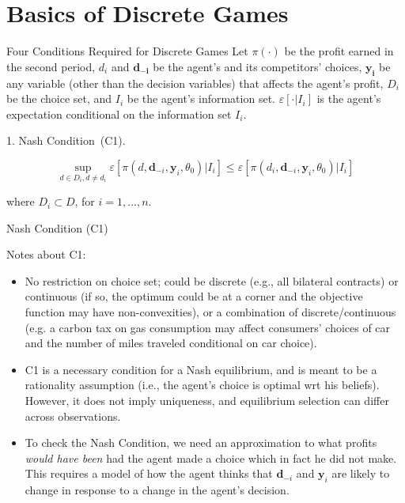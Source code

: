 \section{Basics of Discrete Games}

\begin{frame}{Four Conditions Required for Discrete Games}
Let $\pi(\cdot)$ be the profit earned in the second period, $d_i$ and $\symbf{d_{-i}}$
be the agent's and its competitors' choices, $\symbf{y_i}$ be any variable (other than the decision variables) that affects the agent's profit, $D_i$ be the choice set, and $I_i$ be the agent's information set.  \large{$\varepsilon[\cdot|I_i]$} \normalsize is the agent's expectation conditional on the information set $I_i$.
\vspace{0.2in}

1. Nash Condition\ (C1).

\begin{equation*}
\sup_{d\in D_{i},d\neq d_{i}}\varepsilon\left[ \pi (d,\symbf{d}_{-i},\symbf{y}_{i},\theta _{0})|\mathit{I}_{i}\right] \leq \varepsilon\left[ \pi (d_{i},\symbf{d}_{-i},\symbf{y}_{i},\theta _{0})|\mathit{I}_{i}\right] 
\end{equation*}

where $D_{i}\subset D$, for $i=1,...,n$.

\end{frame}

\begin{frame}{Nash Condition (C1)}

Notes about C1:

\begin{itemize}
\small
\item No restriction on choice set; could be discrete (e.g., all bilateral
contracts) or continuous (if so, the optimum could be at a corner and the objective function may
have non-convexities), or a combination of discrete/continuous (e.g. a carbon tax on gas consumption may affect consumers' choices of car and the number of miles
traveled conditional on car choice).

\item C1 is a necessary condition for a Nash equilibrium, and is meant to be a rationality assumption (i.e., the agent's choice is optimal wrt his beliefs).  However, it does not imply uniqueness, and equilibrium selection can differ across observations.

\item To check the Nash Condition, we need an approximation to what profits \textit{%
would have been} had the agent made a choice which in fact he did not make.
This requires a model of how the agent thinks that $\symbf{d}_{-i}$ and $%
\symbf{y}_{i}$ are likely to change in response to a change in the agent's
decision. 

\end{itemize}

\end{frame}

